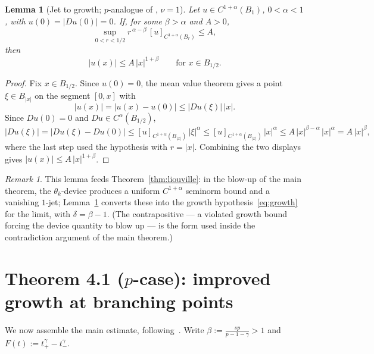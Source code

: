 \documentclass[11pt]{amsart}
\theoremstyle{plain}
\newtheorem{lemma}[theorem]{Lemma}
\theoremstyle{definition}
\theoremstyle{remark}
\newtheorem{remark}[theorem]{Remark}
\begin{document}
\begin{lemma}[Jet to growth; $p$-analogue of {\cite[Lemma 3.1]{PTU}}, $\nu=1$]\label{lem:jet}
Let $u\in C^{1+\alpha}(B_1)$, $0<\alpha<1$, with $u(0)=|Du(0)|=0$. If, for some
$\beta>\alpha$ and $A>0$,
\[
  \sup_{0<r<1/2} r^{\,\alpha-\beta}\,[u]_{C^{1+\alpha}(B_r)}\le A,
\]
then
\[
  |u(x)|\le A\,|x|^{1+\beta}\qquad\text{for }x\in B_{1/2}.
\]
\end{lemma}

\begin{proof}
Fix $x\in B_{1/2}$. Since $u(0)=0$, the mean value theorem gives a point
$\xi\in B_{|x|}$ on the segment $[0,x]$ with
\[
  |u(x)|=|u(x)-u(0)|\le|Du(\xi)|\,|x|.
\]
Since $Du(0)=0$ and $Du\in C^{\alpha}(B_{1/2})$,
\[
  |Du(\xi)|=|Du(\xi)-Du(0)|\le [u]_{C^{1+\alpha}(B_{|x|})}\,|\xi|^{\alpha}
   \le [u]_{C^{1+\alpha}(B_{|x|})}\,|x|^{\alpha}
   \le A\,|x|^{\beta-\alpha}\,|x|^{\alpha}=A\,|x|^{\beta},
\]
where the last step used the hypothesis with $r=|x|$. Combining the two
displays gives $|u(x)|\le A\,|x|^{1+\beta}$.
\end{proof}

\begin{remark}\label{rem:jet-use}
This lemma feeds Theorem~\ref{thm:liouville}: in the blow-up of the main
theorem, the $\theta_k$-device produces a uniform $C^{1+\alpha}$ seminorm bound
and a vanishing $1$-jet; Lemma~\ref{lem:jet} converts these into the growth
hypothesis~\eqref{eq:growth} for the limit, with $\delta=\beta-1$. (The
contrapositive --- a violated growth bound forcing the device quantity to blow
up --- is the form used inside the contradiction argument of the main theorem.)
\end{remark}

\section{Theorem 4.1 ($p$-case): improved growth at branching points}\label{sec:main}
We now assemble the main estimate, following~\cite[\S4]{PTU}. Write
$\beta:=\frac{sp}{p-1-\gamma}>1$ and $F(t):=t_+^\gamma-t_-^\gamma$.
\end{document}
